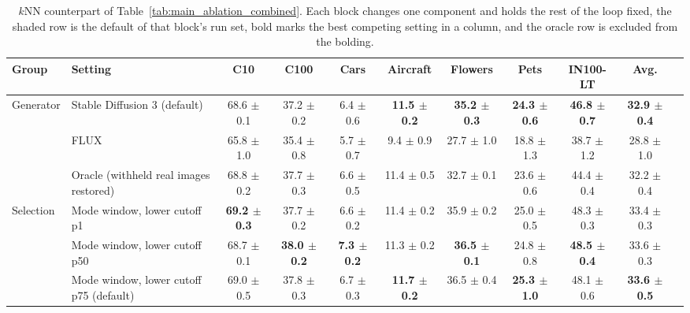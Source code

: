 \begin{table}[t]
\centering
\tiny
\setlength{\tabcolsep}{2.6pt}
\renewcommand{\arraystretch}{0.9}
\caption{$k$NN counterpart of Table~\ref{tab:main_ablation_combined}. Each block changes one component and holds the rest of the loop fixed, the shaded row is the default of that block's run set, bold marks the best competing setting in a column, and the oracle row is excluded from the bolding.}
\label{tab:main_ablation_combined_knn}
\begin{adjustbox}{max width=\textwidth}
\begin{tabular}{l l c c c c c c c c c}
\toprule
Group & Setting & C10 & C100 & Cars & Aircraft & Flowers & Pets & IN100-LT & Avg. \\
\midrule
Generator & Stable Diffusion 3 (default) & 68.6 {\scriptsize$\pm$ 0.1} & 37.2 {\scriptsize$\pm$ 0.2} & 6.4 {\scriptsize$\pm$ 0.6} & \textbf{11.5 {\scriptsize$\pm$ 0.2}} & \textbf{35.2 {\scriptsize$\pm$ 0.3}} & \textbf{24.3 {\scriptsize$\pm$ 0.6}} & \textbf{46.8 {\scriptsize$\pm$ 0.7}} & \textbf{32.9 {\scriptsize$\pm$ 0.4}} \\
 & FLUX & 65.8 {\scriptsize$\pm$ 1.0} & 35.4 {\scriptsize$\pm$ 0.8} & 5.7 {\scriptsize$\pm$ 0.7} & 9.4 {\scriptsize$\pm$ 0.9} & 27.7 {\scriptsize$\pm$ 1.0} & 18.8 {\scriptsize$\pm$ 1.3} & 38.7 {\scriptsize$\pm$ 1.2} & 28.8 {\scriptsize$\pm$ 1.0} \\
 & Oracle (withheld real images restored) & 68.8 {\scriptsize$\pm$ 0.2} & 37.7 {\scriptsize$\pm$ 0.3} & 6.6 {\scriptsize$\pm$ 0.5} & 11.4 {\scriptsize$\pm$ 0.5} & 32.7 {\scriptsize$\pm$ 0.1} & 23.6 {\scriptsize$\pm$ 0.6} & 44.4 {\scriptsize$\pm$ 0.4} & 32.2 {\scriptsize$\pm$ 0.4} \\
\midrule
Selection & Mode window, lower cutoff p1 & \textbf{69.2 {\scriptsize$\pm$ 0.3}} & 37.7 {\scriptsize$\pm$ 0.2} & 6.6 {\scriptsize$\pm$ 0.2} & 11.4 {\scriptsize$\pm$ 0.2} & 35.9 {\scriptsize$\pm$ 0.2} & 25.0 {\scriptsize$\pm$ 0.5} & 48.3 {\scriptsize$\pm$ 0.3} & 33.4 {\scriptsize$\pm$ 0.3} \\
 & Mode window, lower cutoff p50 & 68.7 {\scriptsize$\pm$ 0.1} & \textbf{38.0 {\scriptsize$\pm$ 0.2}} & \textbf{7.3 {\scriptsize$\pm$ 0.2}} & 11.3 {\scriptsize$\pm$ 0.2} & \textbf{36.5 {\scriptsize$\pm$ 0.1}} & 24.8 {\scriptsize$\pm$ 0.8} & \textbf{48.5 {\scriptsize$\pm$ 0.4}} & 33.6 {\scriptsize$\pm$ 0.3} \\
 & Mode window, lower cutoff p75 (default) & 69.0 {\scriptsize$\pm$ 0.5} & 37.8 {\scriptsize$\pm$ 0.3} & 6.7 {\scriptsize$\pm$ 0.3} & \textbf{11.7 {\scriptsize$\pm$ 0.2}} & 36.5 {\scriptsize$\pm$ 0.4} & \textbf{25.3 {\scriptsize$\pm$ 1.0}} & 48.1 {\scriptsize$\pm$ 0.6} & \textbf{33.6 {\scriptsize$\pm$ 0.5}} \\

\end{tabular}
\end{adjustbox}
\end{table}
